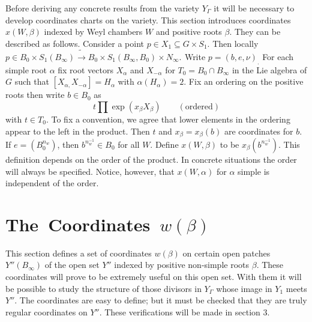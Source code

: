 \documentclass{memo-l}
\theoremstyle{definition}
\theoremstyle{remark}
\numberwithin{section}{chapter}
\numberwithin{equation}{chapter}
\begin{document}
Before deriving any concrete results from the variety $Y_{{\Gamma}}$ it will
be necessary to develop coordinates charts on the variety.
 This section introduces coordinates $x(W,{\beta})$ indexed by Weyl chambers
$W$ and positive roots ${\beta}$.
 They can be described as follows.
 Consider a point $p \in X_{1} {\subseteq} G \times S_{1}$.
 Then locally $p \in B_{0} \times S_{1}(B_{{\infty}}) \tilde{\to}  B_{0}
\times S_{1}(B_{{\infty}},B_{0}) \times N_{{\infty}}._{ }$ Write
$p = (b,e,{\nu})_{.}$  For each simple root ${\alpha}$ fix root vectors
$X_{{\alpha}}$ and $X_{-{\alpha}}$ for $T_{0} = B_{0} {\cap} B_{{\infty}}$
in the Lie algebra of $G$ such that $[X_{{\alpha},}X_{-{\alpha}}] =
H_{{\alpha}}$ with ${\alpha}(H_{{\alpha}})=2$.
 Fix an ordering on the positive roots then write $b \in B_{0}$  as
$$
t \prod  \exp(x_{{\beta}}X_{{\beta}})\qquad  ({\text{ordered}})
$$
with $t \in T_{0}$.
 To fix a convention, we agree that lower elements in the ordering appear
to the left in the product.
 Then $t$ and $x_{{\beta}} = x_{{\beta}}(b)$ are coordinates for $b$.
  If $e = (B_{0}^{n_w})$, then $b^{n_w^{-1}} \in B_{0}$ for all $W$.
 Define $x(W,{\beta})$ to be $x_{{\beta}}(b^{n_w^{-1}})$.
 This definition depends on the order of the product.
 In concrete situations the order will always be specified.
 Notice, however, that $x(W,{\alpha})$ for ${\alpha}$ simple is independent
of the order.

\section{The\ Coordinates\ $w({\beta})$ }

This section defines a set of coordinates $w({\beta})$ on certain open
patches $Y''(B_{{\infty}})$ of the open set $Y''$ indexed by positive non-simple
roots ${\beta}$.
 These coordinates will prove to be extremely useful on this open set.
 With them it will be possible to study the structure of those divisors in
$Y_{{\Gamma}}$ whose image in $Y_{1}$ meets $Y''$.
 The coordinates are easy to define; but it must be checked that they are
truly regular coordinates on $Y''$.
 These verifications will be made in section $3$.
\end{document}
